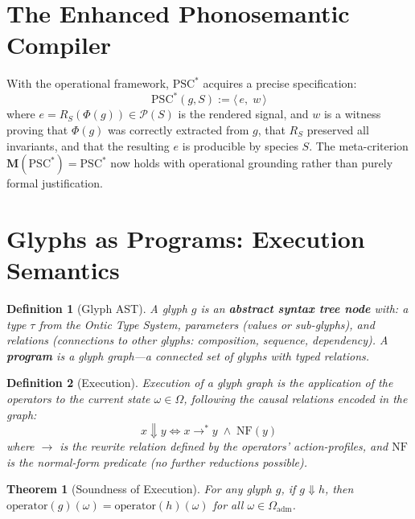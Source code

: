 \documentclass[12pt, letterpaper]{book}
\def\equiv{=}%
\def\mathfrak#1{#1}%
\newtheorem{theorem}{Theorem}[chapter]
\newtheorem{definition}{Definition}[chapter]
\begin{document}
\section{The Enhanced Phonosemantic Compiler}

With the operational framework, $\mathrm{PSC}^*$ acquires a precise specification:
\[
\mathrm{PSC}^*(\mathfrak{g}, S) := \langle\, e,\; w\, \rangle
\]
where $e = R_S(\Phi(\mathfrak{g})) \in \mathcal{P}(S)$ is the rendered signal, and $w$ is a witness proving that $\Phi(\mathfrak{g})$ was correctly extracted from $\mathfrak{g}$, that $R_S$ preserved all invariants, and that the resulting $e$ is producible by species $S$. The meta-criterion $\mathbf{M}(\mathrm{PSC}^*) \equiv \mathrm{PSC}^*$ now holds with operational grounding rather than purely formal justification.

\section{Glyphs as Programs: Execution Semantics}

\begin{definition}[Glyph AST]\label{def:glyph-ast}
A glyph $\mathfrak{g}$ is an \textbf{abstract syntax tree node} with: a \textit{type} $\tau$ from the Ontic Type System, \textit{parameters} (values or sub-glyphs), and \textit{relations} (connections to other glyphs: composition, sequence, dependency). A \textbf{program} is a glyph graph---a connected set of glyphs with typed relations.
\end{definition}

\begin{definition}[Execution]\label{def:execution}
Execution of a glyph graph is the application of the operators to the current state $\omega \in \Omega$, following the causal relations encoded in the graph:
\[
x \Downarrow y \iff x \to^* y \;\land\; \mathrm{NF}(y)
\]
where $\to$ is the rewrite relation defined by the operators' action-profiles, and $\mathrm{NF}$ is the normal-form predicate (no further reductions possible).
\end{definition}

\begin{theorem}[Soundness of Execution]\label{thm:soundness-exec}
For any glyph $\mathfrak{g}$, if $\mathfrak{g} \Downarrow \mathfrak{h}$, then $\mathrm{operator}(\mathfrak{g})(\omega) = \mathrm{operator}(\mathfrak{h})(\omega)$ for all $\omega \in \Omega_{\mathrm{adm}}$.
\end{theorem}
\end{document}
